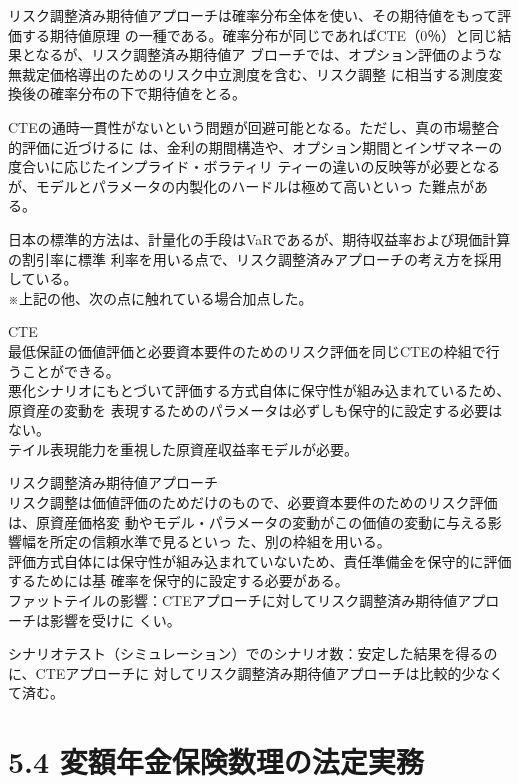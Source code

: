 \documentclass[report,gutter=10mm,fore-edge=10mm,uplatex,dvipdfmx]{jlreq}
\begin{document}
{リスク調整済み期待値アプローチは確率分布全体を使い、その期待値をもって評価する期待値原理
の一種である。確率分布が同じであればCTE（0％）と同じ結果となるが、リスク調整済み期待値ア
ブローチでは、オプション評価のような無裁定価格導出のためのリスク中立測度を含む、リスク調整
に相当する測度変換後の確率分布の下で期待値をとる。

CTEの通時一貫性がないという問題が回避可能となる。ただし、真の市場整合的評価に近づけるに
は、金利の期間構造や、オプション期間とインザマネーの度合いに応じたインプライド・ボラティリ
ティーの違いの反映等が必要となるが、モデルとパラメータの内製化のハードルは極めて高いといっ
た難点がある。

日本の標準的方法は、計量化の手段はVaRであるが、期待収益率および現価計算の割引率に標準
利率を用いる点で、リスク調整済みアプローチの考え方を採用している。\\
※上記の他、次の点に触れている場合加点した。\vspace{1zh}

CTE\\
最低保証の価値評価と必要資本要件のためのリスク評価を同じCTEの枠組で行うことができる。\\
悪化シナリオにもとづいて評価する方式自体に保守性が組み込まれているため、原資産の変動を
表現するためのパラメータは必ずしも保守的に設定する必要はない。\\
テイル表現能力を重視した原資産収益率モデルが必要。

リスク調整済み期待値アプローチ\\
リスク調整は価値評価のためだけのもので、必要資本要件のためのリスク評価は、原資産価格変
動やモデル・パラメータの変動がこの価値の変動に与える影響幅を所定の信頼水準で見るといっ
た、別の枠組を用いる。\\
評価方式自体には保守性が組み込まれていないため、責任準備金を保守的に評価するためには基
確率を保守的に設定する必要がある。\\

ファットテイルの影響：CTEアプローチに対してリスク調整済み期待値アプローチは影響を受けに
くい。

シナリオテスト（シミュレーション）でのシナリオ数：安定した結果を得るのに、CTEアプローチに
対してリスク調整済み期待値アプローチは比較的少なくて済む。
\section{5.4 変額年金保険数理の法定実務}
}
\end{document}

